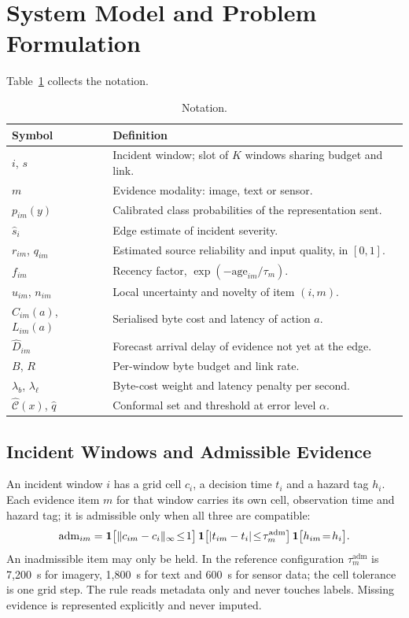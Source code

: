 \documentclass[conference,a4paper]{IEEEtran}
\newif\ifsubmission
\newcommand{\masteronly}[1]{\ifsubmission\else#1\fi}
\begin{document}
\section{System Model and Problem Formulation}
\label{sec:model}
\masteronly{Table~\ref{tab:notation} collects the notation.}

\masteronly{%
\begin{table}[t]
\caption{Notation.}
\label{tab:notation}
\centering\footnotesize
\setlength{\tabcolsep}{3pt}
\begin{tabular}{@{}lp{6.3cm}@{}}
\toprule
Symbol & Definition \\
\midrule
$i$, $s$ & Incident window; slot of $K$ windows sharing budget and link. \\
$m$ & Evidence modality: image, text or sensor. \\
$p_{im}(y)$ & Calibrated class probabilities of the representation sent. \\
$\hat s_i$ & Edge estimate of incident severity. \\
$r_{im}$, $q_{im}$ & Estimated source reliability and input quality, in $[0,1]$. \\
$f_{im}$ & Recency factor, $\exp(-\mathrm{age}_{im}/\tau_m)$. \\
$u_{im}$, $n_{im}$ & Local uncertainty and novelty of item $(i,m)$. \\
$C_{im}(a)$, $L_{im}(a)$ & Serialised byte cost and latency of action $a$. \\
$\hat D_{im}$ & Forecast arrival delay of evidence not yet at the edge. \\
$B$, $R$ & Per-window byte budget and link rate. \\
$\lambda_b$, $\lambda_\ell$ & Byte-cost weight and latency penalty per second. \\
$\hat{\mathcal C}(x)$, $\hat q$ & Conformal set and threshold at error level $\alpha$. \\
\bottomrule
\end{tabular}
\end{table}}%


\subsection{Incident Windows and Admissible Evidence}
An incident window $i$ has a grid cell $c_i$, a decision time $t_i$ and a hazard tag $h_i$. Each evidence item $m$ for that window carries its own cell, observation time and hazard tag; it is admissible only when all three are compatible:
\begin{equation}
\label{eq:adm}
\small
\mathrm{adm}_{im} = \mathbf{1}\big[\|c_{im}-c_i\|_\infty\!\le\! 1\big]\,\mathbf{1}\big[|t_{im}-t_i|\!\le\!\tau^{\mathrm{adm}}_m\big]\,\mathbf{1}\big[h_{im}\!=\!h_i\big].
\end{equation}
An inadmissible item may only be held. In the reference configuration $\tau^{\mathrm{adm}}_m$ is 7,200~s for imagery, 1,800~s for text and 600~s for sensor data; the cell tolerance is one grid step. The rule reads metadata only and never touches labels. Missing evidence is represented explicitly and never imputed.
\end{document}
